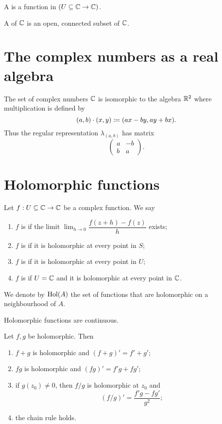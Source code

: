 \begin{definition}
A  is a function in $(U\subseteq \mathbb{C} \to \mathbb{C})$.

A  of $\mathbb{C}$ is an open, connected subset of $\mathbb{C}$.
\end{definition}
\section{The complex numbers as a real algebra}
The set of complex numbers $\mathbb{C}$ is isomorphic to the algebra $\mathbb{R}^2$ where multiplication is defined by
\[ (a, b)\cdot (x, y) \coloneqq (ax-by, ay+bx). \]
Thus the regular representation $\lambda_{(a,b)}$ has matrix
\[ \begin{pmatrix}
a & -b \\ b & a
\end{pmatrix}. \]

\section{Holomorphic functions}
\begin{definition}
Let $f:U\subseteq \mathbb{C} \to \mathbb{C}$ be a complex function. We say
\begin{enumerate}
\item $f$ is  if the limit $\lim_{h\to 0} \dfrac{f(z+h) - f(z)}{h}$
exists;
\item $f$ is  if it is holomorphic at every point in $S$;
\item $f$ is  if it is holomorphic at every point in $U$;
\item $f$ is  if $U=\mathbb{C}$ and it is holomorphic at every point in $\mathbb{C}$.
\end{enumerate}
We denote by $\operatorname{Hol}(A)$ the set of functions that are holomorphic on a neighbourhood of $A$.
\end{definition}

\begin{lemma}
Holomorphic functions are continuous.
\end{lemma}
\begin{lemma}
Let $f,g$ be holomorphic. Then
\begin{enumerate}
\item $f+g$ is holomorphic and $(f+g)' = f'+g'$;
\item $fg$ is holomorphic and $(fg)' = f'g+fg'$;
\item if $g(z_0)\neq 0$, then $f/g$ is holomorphic at $z_0$ and
\[ (f/g)' = \frac{f'g - fg'}{g^2}; \]
\item the chain rule holds.
\end{enumerate}
\end{lemma}

